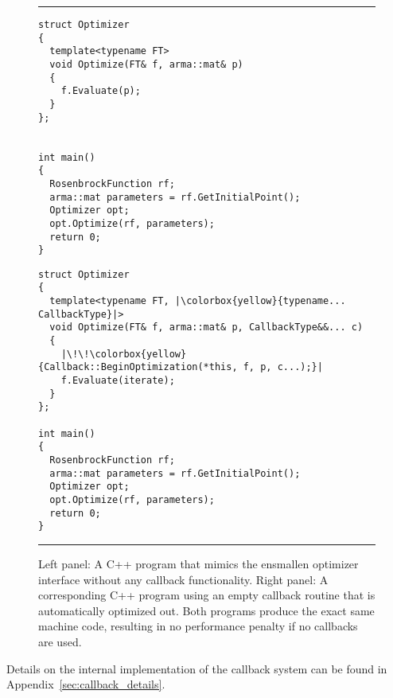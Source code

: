 \begin{figure}[b!]
\centering
\hrule
\vspace{1ex}
\begin{minipage}{0.47\textwidth}
\begin{verbatim}
struct Optimizer
{
  template<typename FT>
  void Optimize(FT& f, arma::mat& p)
  {
    f.Evaluate(p);
  }
};


int main()
{
  RosenbrockFunction rf;
  arma::mat parameters = rf.GetInitialPoint();
  Optimizer opt;
  opt.Optimize(rf, parameters);
  return 0;
}

\end{verbatim}
\end{minipage}
%
\hfill
\vline
\hfill
%
\begin{minipage}{0.51\textwidth}
\begin{verbatim}
struct Optimizer
{
  template<typename FT, |\colorbox{yellow}{typename... CallbackType}|>
  void Optimize(FT& f, arma::mat& p, CallbackType&&... c)
  {
    |\!\!\colorbox{yellow}{Callback::BeginOptimization(*this, f, p, c...);}|
    f.Evaluate(iterate);
  }
};

int main()
{
  RosenbrockFunction rf;
  arma::mat parameters = rf.GetInitialPoint();
  Optimizer opt;
  opt.Optimize(rf, parameters);
  return 0;
}
\end{verbatim}
\end{minipage}
\vspace{1ex}
\hrule
\caption
  {
  Left panel: A C++ program that mimics the ensmallen optimizer interface
  without any callback functionality. Right panel: A corresponding C++ program
  using an empty callback routine that is automatically optimized out. Both
  programs produce the exact same machine code, resulting in no performance
  penalty if no callbacks are used.
  }
\label{fig:callback_compilter_opt}
\end{figure}

Details on the internal implementation of the callback system can be found in
Appendix~\ref{sec:callback_details}.
